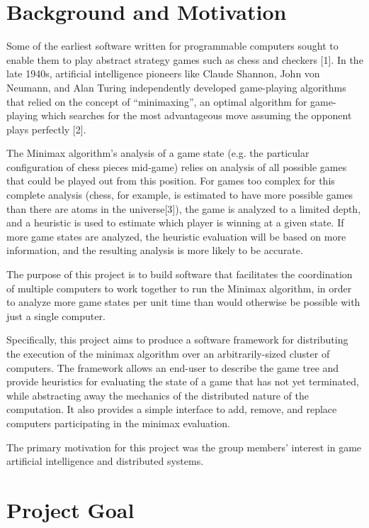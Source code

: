 \documentclass[pdftex,12pt,a4paper]{article}
\begin{document}
%
%
\section{Background and Motivation}
Some of the earliest software written for programmable computers sought to enable them to play abstract strategy games such as chess and checkers [1]. In the late 1940s, artificial intelligence pioneers like Claude Shannon, John von Neumann, and Alan Turing independently developed game-playing algorithms that relied on the concept of “minimaxing”, an optimal algorithm for game-playing which searches for the most advantageous move assuming the opponent plays perfectly [2].

The Minimax algorithm's analysis of a game state (e.g. the particular configuration of chess pieces mid-game) relies on analysis of all possible games that could be played out from this position. For games too complex for this complete analysis (chess, for example, is estimated to have more possible games than there are atoms in the universe[3]), the game is analyzed to a limited depth, and a heuristic is used to estimate which player is winning at a given state. If more game states are analyzed, the heuristic evaluation will be based on more information, and the resulting analysis is more likely to be accurate.

The purpose of this project is to build software that facilitates the coordination of multiple computers to work together to run the Minimax algorithm, in order to analyze more game states per unit time than would otherwise be possible with just a single computer.

Specifically, this project aims to produce a software framework for distributing the execution of the minimax algorithm over an arbitrarily-sized cluster of computers. The framework allows an end-user to describe the game tree and provide heuristics for evaluating the state of a game that has not yet terminated, while abstracting away the mechanics of the distributed nature of the computation. It also provides a simple interface to add, remove, and replace computers participating in the minimax evaluation. 

The primary motivation for this project was the group members’ interest in game artificial intelligence and distributed systems.

%
%
\section{Project Goal}
\end{document}
